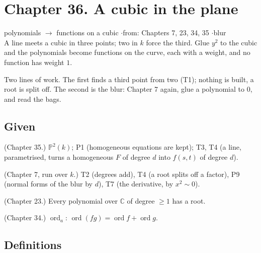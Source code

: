 \section*{Chapter 36. A cubic in the plane}
\begin{center}
{\normalsize polynomials $\to$ functions on a cubic \quad$\cdot$\quad from: Chapters 7, 23, 34, 35 \quad$\cdot$\quad blur}\\[4pt]
{\small A line meets a cubic in three points; two in $k$ force the third. Glue $y^2$ to the cubic and the polynomials become functions on the curve, each with a weight, and no function has weight $1$.}
\end{center}

Two lines of work. The first finds a third point from two (T1); nothing is built, a root is split off. The second is the blur: Chapter 7 again, glue a polynomial to $0$, and read the bags.

\subsection*{Given}

\begin{lines}
\item[\lab{G1}] (Chapter 35.) $\mathbb{P}^2(k)$; P1 (homogeneous equations are kept); T3, T4 (a line, parametrised, turns a homogeneous $F$ of degree $d$ into $f(s, t)$ of degree $d$).
\item[\lab{G2}] (Chapter 7, run over $k$.) T2 (degrees add), T4 (a root splits off a factor), P9 (normal forms of the blur by $d$), T7 (the derivative, by $x^2 \sim 0$).
\item[\lab{G3}] (Chapter 23.) Every polynomial over $\mathbb{C}$ of degree $\ge 1$ has a root.
\item[\lab{G4}] (Chapter 34.) $\operatorname{ord}_a$: $\operatorname{ord}(fg) = \operatorname{ord} f + \operatorname{ord} g$.
\end{lines}

\subsection*{Definitions}

